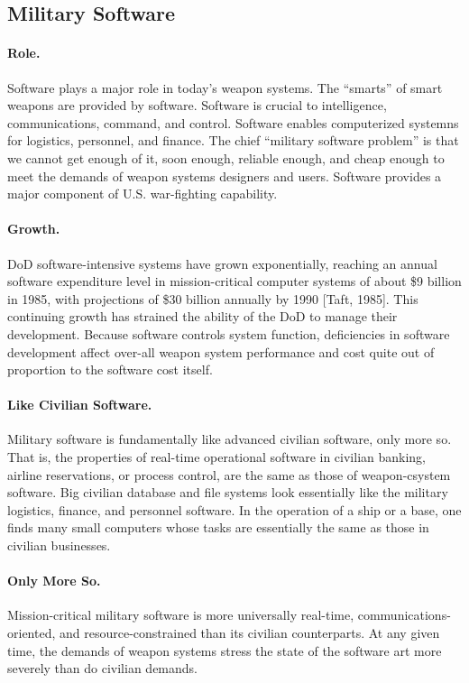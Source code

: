 \documentclass[12pt]{article}
\begin{document}
\subsection{Military Software}

\paragraph{Role.} Software plays a major role in today’s weapon systems. The
“smarts” of smart weapons are provided by software. Software is crucial to
intelligence, communications, command, and control. Software enables
computerized systemns for logistics, personnel, and finance. The chief
“military software problem” is that we cannot get enough of it, soon enough,
reliable enough, and cheap enough to meet the demands of weapon systems
designers and users. Software provides a major component of U.S. war-fighting
capability.

\paragraph{Growth.} DoD software-intensive systems have grown exponentially,
reaching an annual software expenditure level in mission-critical computer
systems of about \$9 billion in 1985, with projections of \$30 billion annually
by 1990 [Taft, 1985].  This continuing growth has strained the ability of the
DoD to manage their development. Because software controls system function,
deficiencies in software development affect over-all weapon system performance
and cost quite out of proportion to the software cost itself.

\paragraph{Like Civilian Software.} Military software is fundamentally like
advanced civilian software, only more so. That is, the properties of real-time
operational software in civilian banking, airline reservations, or process
control, are the same as those of weapon-csystem software. Big civilian
database and file systems look essentially like the military logistics,
finance, and personnel software. In the operation of a ship or a base, one
finds many small computers whose tasks are essentially the same as those in
civilian businesses.

\paragraph{Only More So.} Mission-critical military software is more
universally real-time, communications-oriented, and resource-constrained than
its civilian counterparts. At any given time, the demands of weapon systems
stress the state of the software art more severely than do civilian demands.
\end{document}
